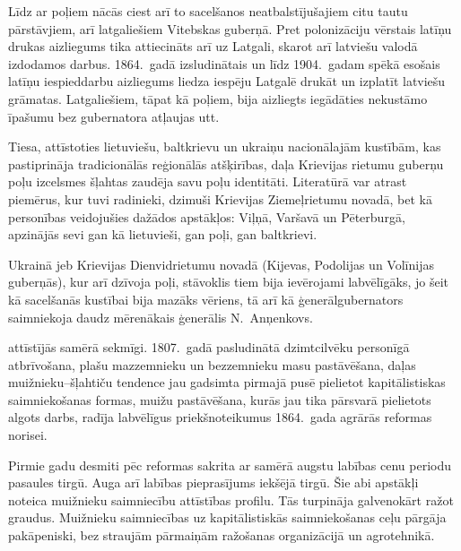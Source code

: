 \documentclass[twoside,a5paper,12pt,fleqn,openany]{extbook}
\begin{document}
Līdz ar poļiem nācās ciest arī to sacelšanos neatbalstījušajiem citu tautu pārstāvjiem, arī latgaliešiem Vitebskas guberņā. Pret polonizāciju vērstais latīņu drukas aizliegums tika attiecināts arī uz Latgali, skarot arī latviešu valodā izdodamos darbus. 1864.~gadā izsludinātais un līdz 1904.~gadam spēkā esošais latīņu iespieddarbu aizliegums liedza iespēju Latgalē drukāt un izplatīt latviešu grāmatas. Latgaliešiem, tāpat kā poļiem, bija aizliegts iegādāties nekustāmo īpašumu bez gubernatora atļaujas utt.

Tiesa, attīstoties lietuviešu, baltkrievu un ukraiņu nacionālajām kustībām, kas pastiprināja tradicionālās reģionālās atšķirības, daļa Krievijas rietumu guberņu poļu izcelsmes šļahtas zaudēja savu poļu identitāti. Literatūrā var atrast piemērus, kur tuvi radinieki, dzimuši Krievijas Ziemeļrietumu novadā, bet kā personības veidojušies dažādos apstākļos: Viļņā, Varšavā un Pēterburgā, apzinājās sevi gan kā lietuvieši, gan poļi, gan baltkrievi.

Ukrainā jeb Krievijas Dienvidrietumu novadā (Kijevas, Podolijas un Volīnijas guberņās), kur arī dzīvoja poļi, stāvoklis tiem bija ievērojami labvēlīgāks, jo šeit kā sacelšanās kustībai bija mazāks vēriens, tā arī kā ģenerālgubernators saimniekoja daudz mērenākais ģenerālis N.~Anņenkovs.

 attīstījās samērā sekmīgi. 1807.~gadā pasludinātā dzimtcilvēku personīgā atbrīvošana, plašu mazzemnieku un bezzemnieku masu pastāvēšana, daļas muižnieku--šļahtiču tendence jau gadsimta pirmajā pusē pielietot kapitālistiskas saimniekošanas formas, muižu pastāvēšana, kurās jau tika pārsvarā pielietots algots darbs, radīja labvēlīgus priekšnoteikumus 1864.~gada agrārās reformas norisei.

Pirmie gadu desmiti pēc reformas sakrita ar samērā augstu labības cenu periodu pasaules tirgū. Auga arī labības pieprasījums iekšējā tirgū. Šie abi apstākļi noteica muižnieku saimniecību attīstības profilu. Tās turpināja galvenokārt ražot graudus. Muižnieku saimniecības uz kapitālistiskās saimniekošanas ceļu pārgāja pakāpeniski, bez straujām pārmaiņām ražošanas organizācijā un agrotehnikā.
\end{document}
